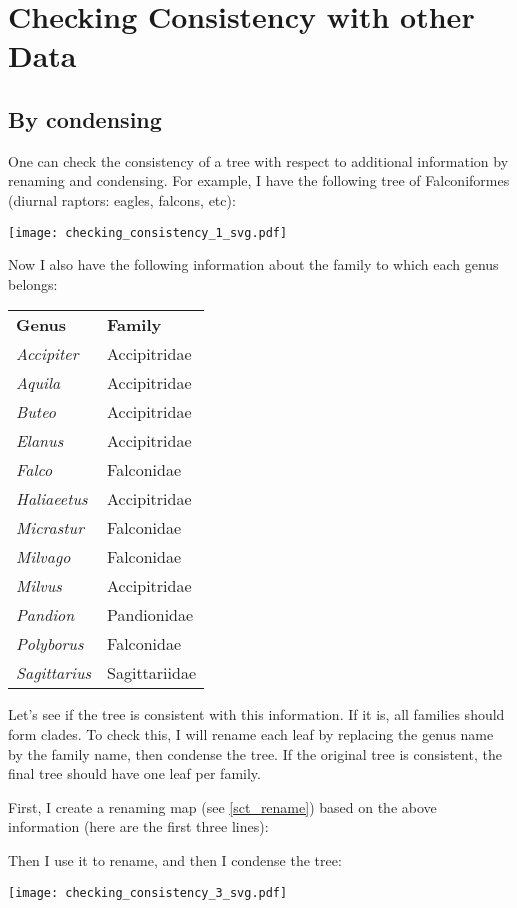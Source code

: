 \section{Checking Consistency with other Data}
\label{sct_check_consistency}

\subsection{By condensing}

One can check the consistency of a tree with respect to additional information
by renaming and condensing. For example, I have the following tree of
Falconiformes (diurnal raptors: eagles, falcons, etc):

\texttt{[image: checking\_consistency\_1\_svg.pdf]}

\noindent{}Now I also have the following information about the family to which each genus belongs:

\bigskip{}
\begin{tabular}{ll}
\textbf{Genus} & \textbf{Family} \\
\textit{Accipiter} & Accipitridae \\
\textit{Aquila} & Accipitridae \\
\textit{Buteo} & Accipitridae \\
\textit{Elanus} & Accipitridae \\
\textit{Falco} & Falconidae \\
\textit{Haliaeetus} & Accipitridae \\
\textit{Micrastur} & Falconidae \\
\textit{Milvago} & Falconidae \\
\textit{Milvus} & Accipitridae \\
\textit{Pandion} & Pandionidae \\
\textit{Polyborus} & Falconidae \\
\textit{Sagittarius} & Sagittariidae
\end{tabular}
\bigskip{}

Let's see if the tree is consistent with this information. If it is, all
families should form clades. To check this, I will rename each leaf by
replacing the genus name by the family name, then condense the tree. If the
original tree is consistent, the final tree should have one leaf per family.

First, I create a renaming map (see \ref{sct_rename}) based on the above
information (here are the first three lines):


Then I use it to rename, and then I condense the tree:

\texttt{[image: checking\_consistency\_3\_svg.pdf]}

